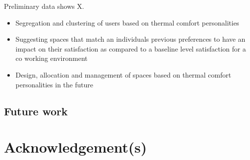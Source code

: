 \documentclass[]{interact}
\theoremstyle{plain}%
\theoremstyle{definition}
\theoremstyle{remark}
\begin{document}
Preliminary data shows X.

\begin{itemize}
	\item Segregation and clustering of users based on thermal comfort personalities
    \item Suggesting spaces that match an individuals previous preferences to have an impact on their satisfaction as compared to a baseline level satisfaction for a co working environment
    \item Design, allocation and management of spaces based on thermal comfort personalities in the future
\end{itemize}

\subsection{Future work}



\section*{Acknowledgement(s)}




\end{document}
